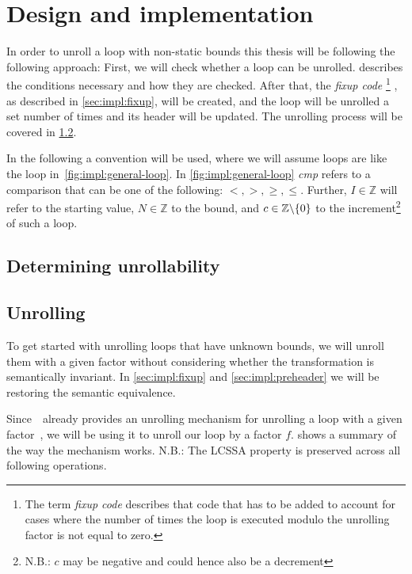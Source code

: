 \chapter{Design and implementation}\label{sec:impl}

In order to unroll a loop with non-static bounds this thesis will be following the following approach:
First, we will check whether a loop can be unrolled.
 describes the conditions necessary and how they are checked.
After that, the \textit{fixup code}
\footnote{The term \textit{fixup code} describes that code that has to be added to account for cases where the number of times the loop is executed modulo the unrolling factor is not equal to zero.}
, as described in \cref{sec:impl:fixup}, will be created, and the loop will be unrolled a set number of times and its header will be updated.
The unrolling process will be covered in \cref{sec:impl:unroll}.

In the following a convention will be used, where we will assume loops are like the loop in~\ref{fig:impl:general-loop}.
In \cref{fig:impl:general-loop} \textit{cmp} refers to a comparison that can be one of the following: $<, >, \geq, \leq$.
Further, $I \in \mathbb{Z}$ will refer to the starting value, $N \in \mathbb{Z}$ to the bound, and $c \in \mathbb{Z} \backslash \{0\}$ \label{sec:impl::def-c} to the increment\footnote{N.B.: $c$ may be negative and could hence also be a decrement} of such a loop.



\section{Determining unrollability}\label{sec:impl:unrollability}

\section{Unrolling}\label{sec:impl:unroll}

To get started with unrolling loops that have unknown bounds, we will unroll them with a given factor without considering whether the transformation is semantically invariant.
In \cref{sec:impl:fixup} and \cref{sec:impl:preheader} we will be restoring the semantic equivalence.

Since~\libFIRM~already provides an unrolling mechanism for unrolling a loop with a given factor~\cite{aebi18bachelorarbeit}, we will be using it to unroll our loop by a factor $f$.
 shows a summary of the way the mechanism works.
N.B.: The LCSSA property is preserved across all following operations.

